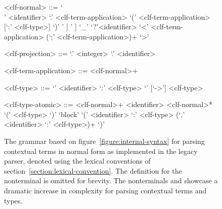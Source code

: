 \begin{figure}[H]
\begin{grammar}
<clf-normal> ::=
     `\\' <identifier> `.' <clf-term-application>
\alt `(' <clf-term-application> [`:' <clf-type>] `)'
\alt <hash-identifier> [<clf-projection>] [ `[' <clf-substitution> `]' ]
\alt <qualified-identifier> [<clf-projection>] [ `[' <clf-substitution> `]' ]
\alt `_'
\alt `?'<identifier>
\alt `<' <clf-term-application> (`;' <clf-term-application>)+ `>'

<clf-projection> ::=
     `.' <integer>
\alt `.' <identifier>

<clf-term-application> ::=
     <clf-normal>+

<clf-type> ::=
     `{' <identifier> `:' <clf-type> `}' [`->'] <clf-type>

<clf-type-atomic> ::=
     <clf-normal>+
\alt <identifier> <clf-normal>*
\alt `(' <clf-type> `)'
\alt `block' `(' <identifier> `:' <clf-type> (`,' <identifier> `:' <clf-type>)+ `)'
\end{grammar}
\caption[Grammar for parsing contextual \acs{LF} terms in normal form in the legacy \Beluga parser]{%
The grammar based on figure~\ref{figure:internal-syntax} for parsing contextual \LF terms in normal form as implemented in the legacy parser, denoted using the lexical conventions of section~\ref{section:lexical-convention}.
The definition for the nonterminal  is omitted for brevity.
The nonterminals  and  showcase a dramatic increase in complexity for parsing contextual \LF terms and types.
}
\label{figure:legacy-clf-parsing}
\end{figure}

